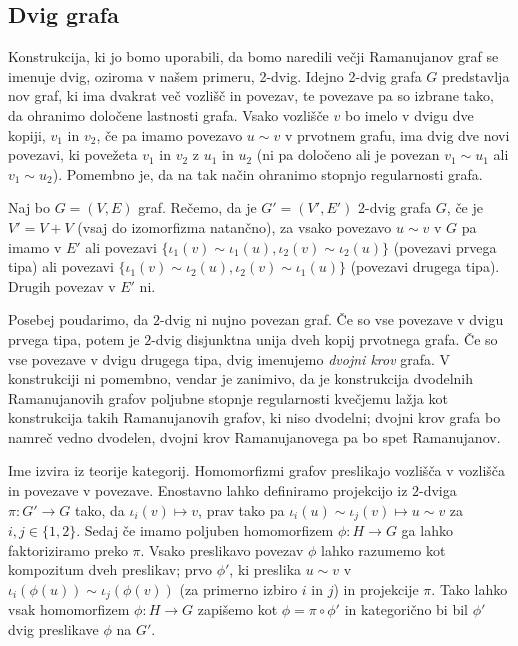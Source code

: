 \subsection{Dvig grafa}
Konstrukcija, ki jo bomo uporabili, da bomo naredili večji Ramanujanov graf se imenuje dvig, oziroma v našem primeru, 2-dvig. Idejno 2-dvig grafa \(G\) predstavlja nov graf, ki ima dvakrat več vozlišč in povezav, te povezave pa so izbrane tako, da ohranimo določene lastnosti grafa. Vsako vozlišče \(v\) bo imelo v dvigu dve kopiji, \(v_1\) in \(v_2\), če pa imamo povezavo \(u\sim v\) v prvotnem grafu, ima dvig dve novi povezavi, ki povežeta \(v_1\) in \(v_2\) z \(u_1\) in \(u_2\) (ni pa določeno ali je povezan \(v_1\sim u_1\) ali \(v_1\sim u_2\)). Pomembno je, da na tak način ohranimo stopnjo regularnosti grafa.

\begin{definicija}
    Naj bo \(G = (V, E)\) graf. Rečemo, da je \(G'= (V', E')\) 2-dvig grafa \(G\), če je \(V' = V + V\) (vsaj do izomorfizma natančno), za vsako povezavo \(u\sim v\) v \(G\) pa imamo v \(E'\) ali povezavi \(\{\iota_1(v)\sim \iota_1(u), \iota_2(v)\sim \iota_2(u)\}\) (povezavi prvega tipa) ali povezavi \(\{\iota_1(v)\sim \iota_2(u), \iota_2(v)\sim \iota_1(u)\}\) (povezavi drugega tipa). Drugih povezav v \(E'\) ni.
\end{definicija}

Posebej poudarimo, da \(2\)-dvig ni nujno povezan graf. Če so vse povezave v dvigu prvega tipa, potem je \(2\)-dvig disjunktna unija dveh kopij prvotnega grafa. Če so vse povezave v dvigu drugega tipa, dvig imenujemo \emph{dvojni krov} grafa. V konstrukciji ni pomembno, vendar je zanimivo, da je konstrukcija dvodelnih Ramanujanovih grafov poljubne stopnje regularnosti kvečjemu lažja kot konstrukcija takih Ramanujanovih grafov, ki niso dvodelni; dvojni krov grafa bo namreč vedno dvodelen, dvojni krov Ramanujanovega pa bo spet Ramanujanov.

Ime izvira iz teorije kategorij. Homomorfizmi grafov preslikajo vozlišča v vozlišča in povezave v povezave. Enostavno lahko definiramo projekcijo iz \(2\)-dviga \(\pi: G'\to G\) tako, da \(\iota_i(v)\mapsto v\), prav tako pa \(\iota_i(u)\sim\iota_j(v)\mapsto u\sim v\) za \(i, j\in \{1,2\}\). Sedaj če imamo poljuben homomorfizem \(\phi: H\to G\) ga lahko faktoriziramo preko \(\pi\). Vsako preslikavo povezav \(\phi\) lahko razumemo kot kompozitum dveh preslikav; prvo \(\phi'\), ki preslika \(u\sim v\) v \(\iota_i(\phi(u)) \sim \iota_j(\phi(v))\) (za primerno izbiro \(i\) in \(j\)) in projekcije \(\pi\). Tako lahko vsak homomorfizem \(\phi: H\to G\) zapišemo kot \(\phi = \pi\circ \phi'\) in kategorično bi bil \(\phi'\) dvig preslikave \(\phi\) na \(G'\).

